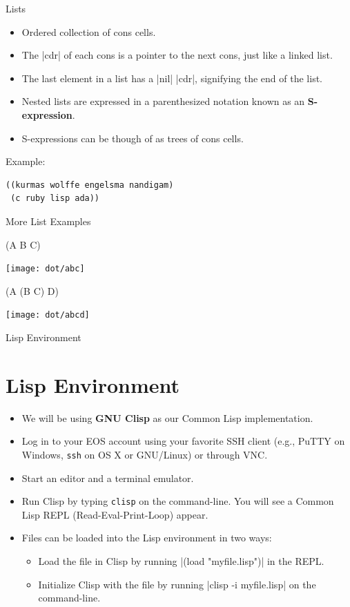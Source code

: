 \documentclass{beamer}
\begin{document}

\begin{frame}[fragile]{Lists}
\begin{itemize}
\item Ordered collection of cons cells.
\item The \cl|cdr| of each cons is a pointer to the next cons, just like a linked list.
\item The last element in a list has a \cl|nil| \cl|cdr|, signifying the end of the list.
\item Nested lists are expressed in a parenthesized notation known as an \textbf{S-expression}.
\item S-expressions can be though of as trees of cons cells.
\end{itemize}
Example:
\begin{verbatim}
((kurmas wolffe engelsma nandigam)
 (c ruby lisp ada))
\end{verbatim}
\end{frame}

\begin{frame}[fragile]{More List Examples}
  \begin{clcode}
    (A B C)
  \end{clcode}
\texttt{[image: dot/abc]}
\begin{clcode}
  (A (B C) D)
\end{clcode}
\texttt{[image: dot/abcd]}
\end{frame}

\begin{frame}{Lisp Environment}
  \section{Lisp Environment}
  \begin{itemize}
  \item We will be using \textbf{GNU Clisp} as our Common Lisp implementation.
  \item Log in to your EOS account using your favorite SSH client
    (e.g., PuTTY on Windows, \texttt{ssh} on OS X or GNU/Linux) or
    through VNC.
  \item Start an editor and a terminal emulator.
  \item Run Clisp by typing \texttt{clisp} on the command-line. You
    will see a Common Lisp REPL (Read-Eval-Print-Loop) appear.
  \item Files can be loaded into the Lisp environment in two ways:
    \begin{itemize}
    \item Load the file in Clisp by running \cl|(load "myfile.lisp")| in the REPL.
    \item Initialize Clisp with the file by running |clisp -i myfile.lisp| on the command-line.
    \end{itemize}
  \end{itemize}
\end{frame}
\end{document}
